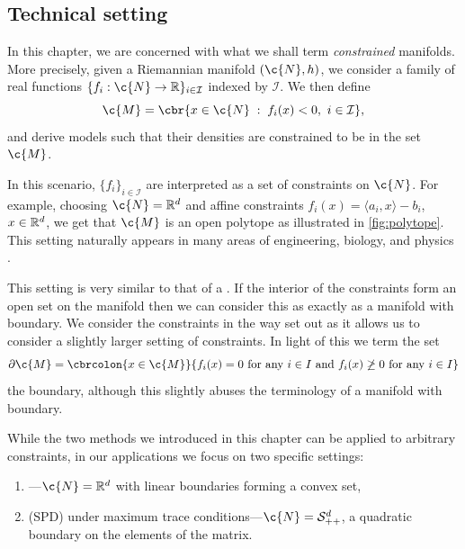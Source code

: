 \subsection{Technical setting}
\label{sec:constrained_diffusion_models}


In this chapter, we are concerned with what we shall term \emph{constrained} manifolds.
More precisely, given a Riemannian manifold \((\c{N}, {h})\), we consider a family of real functions \(\{f_i: \c{N} \to \R\}_{i \in \mathcal{I}}\) indexed by \(\mathcal{I}\).
We then define \begin{equation} \label{eq:constrained} \c{M} = \cbr{x \in \c{N} \; : \; f_i(x) < 0 , \ i \in \mathcal{I}},
\end{equation}
and derive models such that their densities are constrained to be in the set \(\c{M}\).

In this scenario, \(\{f_i\}_{i \in \mathcal{I}}\) are interpreted as a set of constraints on \(\c{N}\).
For example, choosing \(\c{N} = \R^d\) and affine constraints \(f_i(x) = \langle a_i, x\rangle - b_i\), \(x\in \mathbb{R}^d\), we get that \(\c{M}\) is an open polytope as illustrated in \cref{fig:polytope}.
This setting naturally appears in many areas of engineering, biology, and physics \parencite{boyd2004convex, han2006inverse, lukens2020practical}.

This setting is very similar to that of a . 
If the interior of the constraints form an open set on the manifold then we can consider this as exactly as a manifold with boundary.
We consider the constraints in the way set out as it allows us to consider a slightly larger setting of constraints.
In light of this we term the set
\[\partial \c{M} = \cbrcolon{x \in \c{M}}{f_i(x) = 0 \text{ for any } i \in I \text{ and } f_i(x) \not\geq 0 \text{ for any } i\in I}\]
the boundary, although this slightly abuses the terminology of a manifold with boundary.

While the two methods we introduced in this chapter can be applied to arbitrary constraints, in our applications we focus on two specific settings: \begin{enumerate}[label=(\alph*)] \item {}---\(\c{N} = \R^d\) with linear boundaries forming a convex set, \item {} (SPD) under maximum trace conditions---\(\c{N}=\mathcal{S}_{++}^{d}\), a quadratic boundary on the elements of the matrix.
\end{enumerate}

